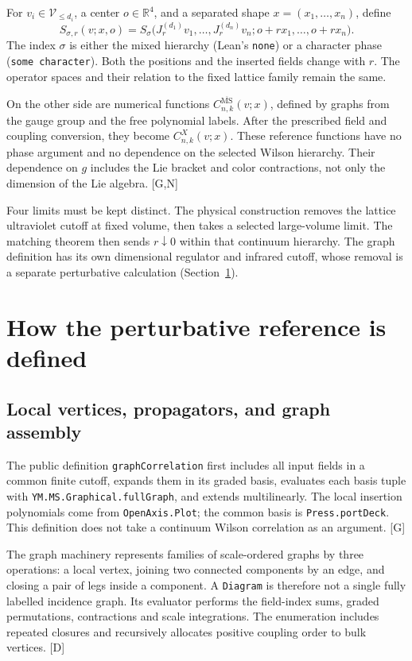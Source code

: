 \documentclass[11pt]{article}
\newcommand{\R}{\mathbb R}
\newcommand{\MS}{\overline{\mathrm{MS}}}
\newcommand{\code}[1]{{\small\nolinkurl{#1}}}
\newcommand{\src}[1]{\textsf{[#1]}}
\begin{document}
For $v_i\in\mathcal V_{\le d_i}$, a center $o\in\R^4$, and a separated
shape $x=(x_1,\ldots,x_n)$, define
\begin{equation}\label{eq:measured}
 S_{\sigma,r}(v;x,o)=
 S_\sigma\bigl(J_r^{(d_1)}v_1,\ldots,J_r^{(d_n)}v_n;
                   o+rx_1,\ldots,o+rx_n\bigr).
\end{equation}
The index $\sigma$ is either the mixed hierarchy (Lean's \code{none}) or
a character phase (\code{some character}). Both the positions and the
inserted fields change with $r$. The operator spaces and their relation
to the fixed lattice family remain the same.

On the other side are numerical functions
$C^{\MS}_{n,k}(v;x)$, defined by graphs from the gauge group and the free
polynomial labels. After the prescribed field and coupling conversion,
they become $C^X_{n,k}(v;x)$. These reference functions have no phase
argument and no dependence on the selected Wilson hierarchy. Their
dependence on $g$ includes the Lie bracket and color contractions, not
only the dimension of the Lie algebra. \src{G,N}

Four limits must be kept distinct. The physical construction removes
the lattice ultraviolet cutoff at fixed volume, then takes a selected
large-volume limit. The matching theorem then sends $r\downarrow0$
within that continuum hierarchy. The graph definition has its own
dimensional regulator and infrared cutoff, whose removal is a separate
perturbative calculation (Section~\ref{sec:graphs}).

\section{How the perturbative reference is defined}
\label{sec:graphs}

\subsection{Local vertices, propagators, and graph assembly}

The public definition \code{graphCorrelation} first includes all input
fields in a common finite cutoff, expands them in its graded basis,
evaluates each basis tuple with \code{YM.MS.Graphical.fullGraph}, and
extends multilinearly. The local insertion polynomials come from
\code{OpenAxis.Plot}; the common basis is \code{Press.portDeck}. This
definition does not take a continuum Wilson correlation as an argument.
\src{G}

The graph machinery represents families of scale-ordered graphs by
three operations: a local vertex, joining two connected components by
an edge, and closing a pair of legs inside a component. A \code{Diagram}
is therefore not a single fully labelled incidence graph. Its evaluator
performs the field-index sums, graded permutations, contractions and
scale integrations. The enumeration includes repeated closures and
recursively allocates positive coupling order to bulk vertices.
\src{D}
\end{document}
